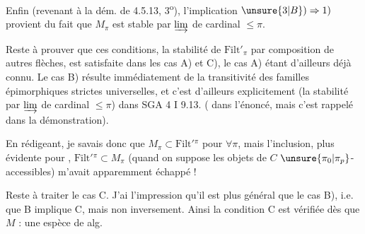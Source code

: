  Enfin (revenant à la dém. de 4.5.13, 3\textsuperscript{o}), l'implication $\unsure{3|B})\Rightarrow1)$ provient du fait que $M_\pi$ est stable par $\varinjlim$ de cardinal $\leq\pi$.

Reste à prouver que ces conditions,  la stabilité de $\mathrm{Filt}'_\pi$ par composition de autres flèches, est satisfaite dans les cas A) et C), le cas A) étant d'ailleurs déjà connu. Le cas B) résulte  immédiatement de la transitivité des familles épimorphiques strictes universelles,  et c'est d'ailleurs  explicitement  (la stabilité  par $\varinjlim$ de cardinal $\leq\pi$) dans SGA 4 I 9.13. ( dans l'énoncé, mais c'est rappelé dans la démonstration).

En rédigeant,  je savais donc que $M_\pi\subset\mathrm{Filt}'{}^\pi$ pour $\forall\pi$, mais l'inclusion, plus évidente pour  , $\mathrm{Filt}'{}^\pi\subset M_\pi$ (quand on suppose les objets de $C$ $\unsure{\pi_0|\pi_p}$-accessibles) m'avait apparemment échappé !

Reste à traiter le cas C. J'ai l'impression qu'il est  plus général que le cas B), i.e. que  B implique C, mais non inversement. Ainsi la condition C est vérifiée dès que $M$  : une espèce de  alg.   
